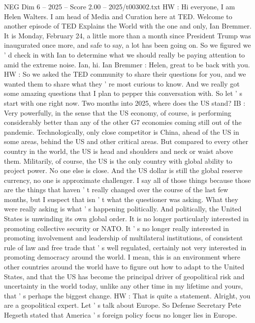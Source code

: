 \begin{textsample}{NEG Dim 6 – 2025 – Score 2.00 – 2025/t003002.txt}  \label{ex:f6_neg_023}
HW : Hi everyone, I am Helen Walters.
I am head of Media and Curation here at TED.
Welcome to another episode of TED Explains the World with the one and only, Ian Bremmer.
It is Monday, February 24, a little more than a month since President Trump was inaugurated once more, and safe to say, a lot has been going on.
So we figured we ' d check in with Ian to determine what we should really be paying attention to amid the extreme noise.
Ian, hi.
Ian Bremmer : Helen, great to be back with you.
HW : So we asked the TED community to share their questions for you, and we wanted them to share what they ' re most curious to know.
And we really got some amazing questions that I plan to pepper this conversation with.
So let ' s start with one right now.
Two months into 2025, where does the US stand?
IB : Very powerfully, in the sense that the US economy, of course, is performing considerably better than any of the other G7 economies coming still out of the pandemic.
Technologically, only close competitor is China, ahead of the US in some areas, behind the US and other critical areas.
But compared to every other country in the world, the US is head and shoulders and neck or waist above them.
Militarily, of course, the US is the only country with global ability to project power.
No one else is close.
And the US dollar is still the global reserve currency, no one is approximate challenger.
I say all of those things because those are the things that haven ' t really changed over the course of the last few months, but I suspect that isn ' t what the questioner was asking.
What they were really asking is what ' s happening politically.
And politically, the United States is unwinding its own global order.
It is no longer particularly interested in promoting collective security or NATO.
It ' s no longer really interested in promoting involvement and leadership of multilateral institutions, of consistent rule of law and free trade that ' s well regulated, certainly not very interested in promoting democracy around the world.
I mean, this is an environment where other countries around the world have to figure out how to adapt to the United States, and that the US has become the principal driver of geopolitical risk and uncertainty in the world today, unlike any other time in my lifetime and yours, that ' s perhaps the biggest change.
HW : That is quite a statement.
Alright, you are a geopolitical expert.
Let ' s talk about Europe.
So Defense Secretary Pete Hegseth stated that America ' s foreign policy focus no longer lies in Europe.

\end{textsample}
